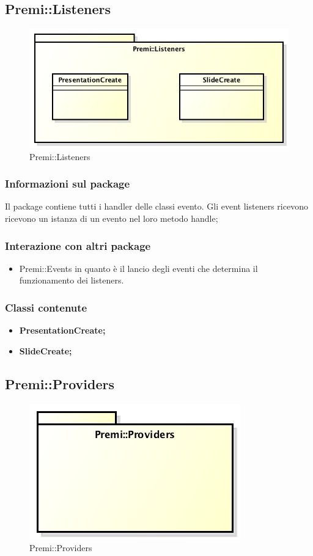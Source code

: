 \newpage
\subsection{Premi::Listeners}
\begin{figure}[h]
	\centering
	\includegraphics[width=0.7\linewidth]{img/premi_listeners}
	\caption[Premi::Listeners]{Premi::Listeners}
	\label{fig:premi_listeners}
\end{figure}

\subsubsection*{Informazioni sul package}
Il package contiene tutti i handler delle classi evento. Gli event listeners ricevono ricevono un istanza di un evento nel loro metodo handle;

\subsubsection*{Interazione con altri package}
\begin{itemize}
	\item Premi::Events in quanto è il lancio degli eventi che determina il funzionamento dei listeners.
\end{itemize}

\subsubsection*{Classi contenute}
\begin{itemize}
	\item \textbf{PresentationCreate; }
	\item \textbf{SlideCreate; }
\end{itemize}

\newpage
\subsection{Premi::Providers}
\begin{figure}[h]
	\centering
	\includegraphics[width=0.6\linewidth]{img/premi_providers}
	\caption[Premi::Providers]{Premi::Providers}
	\label{fig:premi_providers}
\end{figure}

